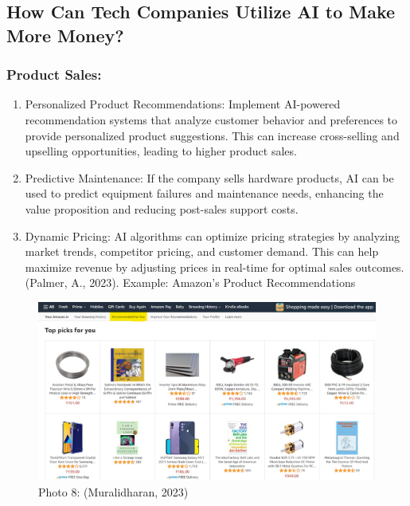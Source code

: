 \documentclass[
]{article}
\begin{document}
\hypertarget{how-can-tech-companies-utilize-ai-to-make-more-money}{%
\subsection{How Can Tech Companies Utilize AI to Make More Money?}\label{how-can-tech-companies-utilize-ai-to-make-more-money}}

\hypertarget{product-sales}{%
\subsubsection{Product Sales:}\label{product-sales}}

\begin{enumerate}
\def\labelenumi{\arabic{enumi}.}
\item
  Personalized Product Recommendations: Implement AI-powered recommendation systems that analyze customer behavior and preferences to provide personalized product suggestions. This can increase cross-selling and upselling opportunities, leading to higher product sales.
\item
  Predictive Maintenance: If the company sells hardware products, AI can be used to predict equipment failures and maintenance needs, enhancing the value proposition and reducing post-sales support costs.
\item
  Dynamic Pricing: AI algorithms can optimize pricing strategies by analyzing market trends, competitor pricing, and customer demand. This can help maximize revenue by adjusting prices in real-time for optimal sales outcomes.(Palmer, A., 2023). Example: Amazon's Product Recommendations
\end{enumerate}

\begin{figure}
\centering
\includegraphics{tech1.png}
\caption{Photo 8: (Muralidharan, 2023)}
\end{figure}
\end{document}
